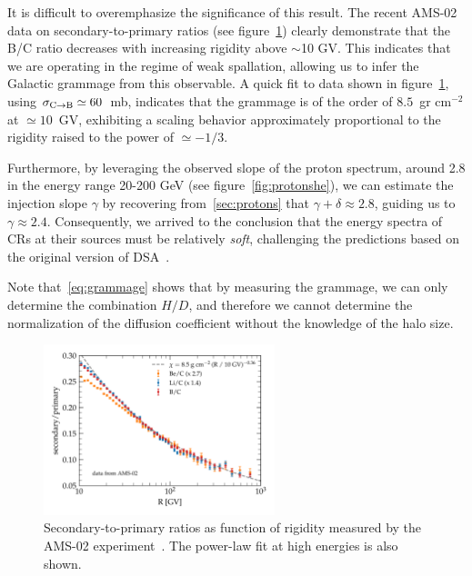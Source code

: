 It is difficult to overemphasize the significance of this result. 
%
The recent AMS-02 data on secondary-to-primary ratios (see figure~\ref{fig:bcams02}) clearly demonstrate that the B/C ratio decreases with increasing rigidity above $\sim$10 GV. %
%
This indicates that we are operating in the regime of weak spallation, allowing us to infer the Galactic grammage from this observable.
%
A quick fit to data shown in figure~\ref{fig:bcams02}, using $\sigma_{\rm C \rightarrow B} \simeq 60$~mb, indicates that the grammage is of the order of $8.5$~gr cm$^{-2}$ at $\simeq 10$~GV, exhibiting a scaling behavior approximately proportional to the rigidity raised to the power of $\simeq -1/3$. 

Furthermore, by leveraging the observed slope of the proton spectrum, around 2.8 in the energy range 20-200 GeV (see figure~\ref{fig:protonshe}), we can estimate the injection slope $\gamma$ by recovering from~\cref{sec:protons} that $\gamma + \delta \approx 2.8$, guiding us to $\gamma \approx 2.4$. 
%
Consequently, we arrived to the conclusion that the energy spectra of CRs at their sources must be relatively \emph{soft}, challenging the predictions based on the original version of DSA~\cite{Capriolilecturenotes}.

Note that~\cref{eq:grammage} shows that by measuring the grammage, we can only determine the combination $H/D$, and therefore we cannot determine the normalization of the diffusion coefficient without the knowledge of the halo size.

\begin{figure}
\centering
\includegraphics[width=0.6\textwidth]{figures/LiBeB_C_AMS02.pdf}
\caption{Secondary-to-primary ratios as function of rigidity measured by the AMS-02 experiment~\cite{AMS02libeb}. The power-law fit at high energies is also shown.}
\label{fig:bcams02}
\end{figure}

